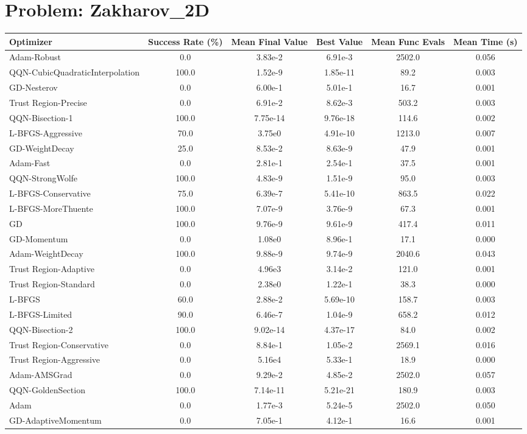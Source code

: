 \documentclass{article}
\begin{document}
\section{Problem: Zakharov\_2D}
\begin{longtable}{p{3cm}*{5}{c}}
\toprule
\textbf{Optimizer} & \textbf{Success Rate (\%)} & \textbf{Mean Final Value} & \textbf{Best Value} & \textbf{Mean Func Evals} & \textbf{Mean Time (s)} \\
\midrule
Adam-Robust & 0.0 & 3.83e-2 & 6.91e-3 & 2502.0 & 0.056 \\
QQN-CubicQuadraticInterpolation & 100.0 & 1.52e-9 & 1.85e-11 & 89.2 & 0.003 \\
GD-Nesterov & 0.0 & 6.00e-1 & 5.01e-1 & 16.7 & 0.001 \\
Trust Region-Precise & 0.0 & 6.91e-2 & 8.62e-3 & 503.2 & 0.003 \\
QQN-Bisection-1 & 100.0 & 7.75e-14 & 9.76e-18 & 114.6 & 0.002 \\
L-BFGS-Aggressive & 70.0 & 3.75e0 & 4.91e-10 & 1213.0 & 0.007 \\
GD-WeightDecay & 25.0 & 8.53e-2 & 8.63e-9 & 47.9 & 0.001 \\
Adam-Fast & 0.0 & 2.81e-1 & 2.54e-1 & 37.5 & 0.001 \\
QQN-StrongWolfe & 100.0 & 4.83e-9 & 1.51e-9 & 95.0 & 0.003 \\
L-BFGS-Conservative & 75.0 & 6.39e-7 & 5.41e-10 & 863.5 & 0.022 \\
L-BFGS-MoreThuente & 100.0 & 7.07e-9 & 3.76e-9 & 67.3 & 0.001 \\
GD & 100.0 & 9.76e-9 & 9.61e-9 & 417.4 & 0.011 \\
GD-Momentum & 0.0 & 1.08e0 & 8.96e-1 & 17.1 & 0.000 \\
Adam-WeightDecay & 100.0 & 9.88e-9 & 9.74e-9 & 2040.6 & 0.043 \\
Trust Region-Adaptive & 0.0 & 4.96e3 & 3.14e-2 & 121.0 & 0.001 \\
Trust Region-Standard & 0.0 & 2.38e0 & 1.22e-1 & 38.3 & 0.000 \\
L-BFGS & 60.0 & 2.88e-2 & 5.69e-10 & 158.7 & 0.003 \\
L-BFGS-Limited & 90.0 & 6.46e-7 & 1.04e-9 & 658.2 & 0.012 \\
QQN-Bisection-2 & 100.0 & 9.02e-14 & 4.37e-17 & 84.0 & 0.002 \\
Trust Region-Conservative & 0.0 & 8.84e-1 & 1.05e-2 & 2569.1 & 0.016 \\
Trust Region-Aggressive & 0.0 & 5.16e4 & 5.33e-1 & 18.9 & 0.000 \\
Adam-AMSGrad & 0.0 & 9.29e-2 & 4.85e-2 & 2502.0 & 0.057 \\
QQN-GoldenSection & 100.0 & 7.14e-11 & 5.21e-21 & 180.9 & 0.003 \\
Adam & 0.0 & 1.77e-3 & 5.24e-5 & 2502.0 & 0.050 \\
GD-AdaptiveMomentum & 0.0 & 7.05e-1 & 4.12e-1 & 16.6 & 0.001 \\
\bottomrule
\end{longtable}
\end{document}
